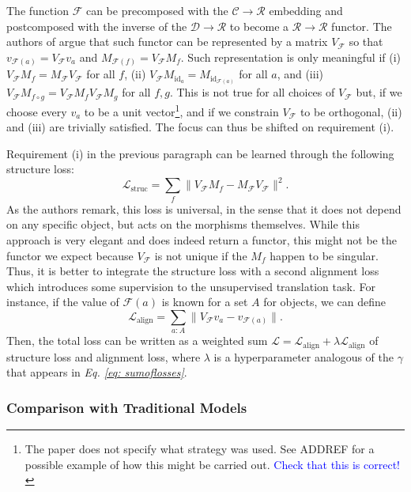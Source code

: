 \documentclass[11pt,a4paper,openright,twoside]{report}
\theoremstyle{plain}
\theoremstyle{definition}
\begin{document}
The function $\mathcal{F}$ can be precomposed with the $\mathcal{C} \to \mathcal{R}$ embedding and postcomposed with the inverse of the $\mathcal{D} \to \mathcal{R}$ to become a $\mathcal{R} \to \mathcal{R}$ functor. The authors of \cite{sheshmani2021categorical} argue that such functor can be represented by a matrix $V_\mathcal{F}$ so that $v_{\mathcal{F}(a)} =  V_\mathcal{F}v_a$ and $M_{\mathcal{F}(f)} = V_\mathcal{F}M_f$. Such representation is only meaningful if (i) $V_{\mathcal{F}}M_f = M_{\mathcal{F}}V_{\mathcal{F}}$ for all $f$, (ii) $V_{\mathcal{F}}M_{\mathrm{id}_a} = M_{\mathrm{id}_{\mathcal{F}(a)}}$ for all $a$, and (iii) $V_{\mathcal{F}}M_{f \circ g} = V_{\mathcal{F}}M_fV_{\mathcal{F}}M_g$ for all $f,g$. This is not true for all choices of  $V_\mathcal{F}$ but, if we choose every $v_a$ to be a unit vector\footnote{The paper does not specify what strategy was used. See ADDREF for a possible example of how this might be carried out. \textcolor{blue}{Check that this is correct!}}, and if we constrain $V_{\mathcal{F}}$ to be orthogonal, (ii) and (iii) are trivially satisfied. The focus can thus be shifted on requirement (i).


Requirement (i) in the previous paragraph can be learned through the following structure loss:
\[\mathcal{L}_{\mathrm{struc}} = \sum_{f}\|V_{\mathcal{F}}M_f - M_{\mathcal{F}}V_{\mathcal{F}}\|^2.\]
As the authors remark, this loss is universal, in the sense that it does not depend on any specific object, but acts on the morphisms themselves. While this approach is very elegant and does indeed return a functor, this might not be the functor we expect because $V_{\mathcal{F}}$ is not unique if the $M_f$ happen to be singular. Thus, it is better to integrate the structure loss with a second alignment loss which introduces some supervision to the unsupervised translation task. For instance, if the value of $\mathcal{F}(a)$ is known for a set $A$ for objects, we can define
\[\mathcal{L}_{\mathrm{align}} = \sum_{a : A}\|V_{\mathcal{F}}v_a - v_{\mathcal{F}(a)}\|.\]
Then, the total loss can be written as a weighted sum $\mathcal{L} = \mathcal{L}_{\mathrm{align}} + \lambda \mathcal{L}_{\mathrm{align}}$ of structure loss and alignment loss, where $\lambda$ is a hyperparameter analogous of the $\gamma$ that appears in \textit{Eq. \ref{eq: sumoflosses}}.


\subsubsection{Comparison with Traditional Models}
\end{document}

